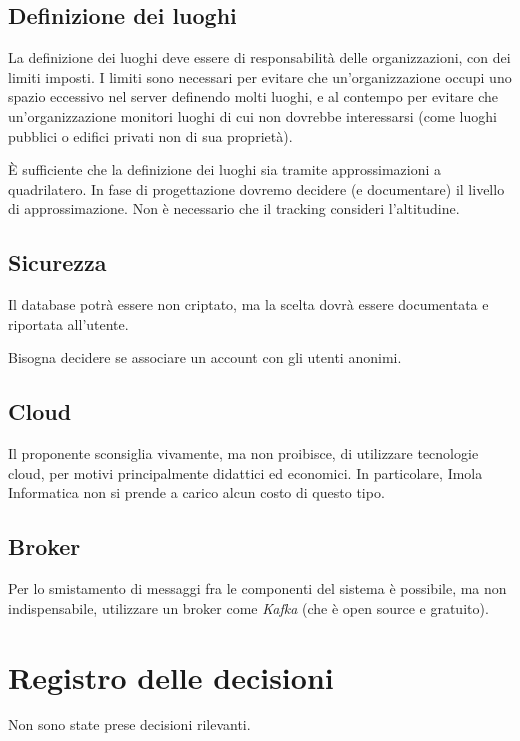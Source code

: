 \documentclass{article}
\begin{document}
\subsection{Definizione dei luoghi}%
\label{sub:definizione_dei_luoghi}
La definizione dei luoghi deve essere di responsabilità delle organizzazioni, con dei limiti imposti.
I limiti sono necessari per evitare che un'organizzazione occupi uno spazio eccessivo nel server definendo molti luoghi, e al contempo per evitare che un'organizzazione monitori luoghi di cui non dovrebbe interessarsi (come luoghi pubblici o edifici privati non di sua proprietà).\par
È sufficiente che la definizione dei luoghi sia tramite approssimazioni a quadrilatero.
In fase di progettazione dovremo decidere (e documentare) il livello di approssimazione. Non è necessario che il tracking consideri l'altitudine.
\subsection{Sicurezza}%
\label{sub:sicurezza}
Il database potrà essere non criptato, ma la scelta dovrà essere documentata e riportata all'utente.\par
Bisogna decidere se associare un account con gli utenti anonimi.
\subsection{Cloud}%
\label{sub:cloud}
Il proponente sconsiglia vivamente, ma non proibisce, di utilizzare tecnologie cloud, per motivi principalmente didattici ed economici. In particolare, Imola Informatica non si prende a carico alcun costo di questo tipo.
\subsection{Broker}%
\label{sub:broker}
Per lo smistamento di messaggi fra le componenti del sistema è possibile, ma non indispensabile, utilizzare un broker come \textit{Kafka} (che è open source e gratuito).
\newpage
\section{Registro delle decisioni}%
\label{sec:registro_delle_decisioni}

Non sono state prese decisioni rilevanti.

\end{document}
